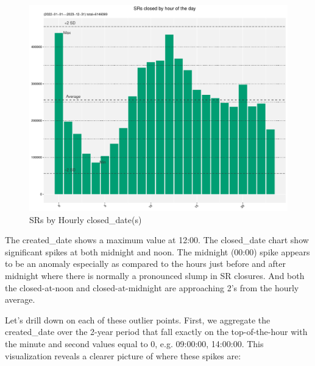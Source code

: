 \documentclass[12pt, titlepage]{article}
\begin{document}
	\begin{figure}[tbp]
		\centering
		\includegraphics[width = \textwidth]{Closed_Hourly_SR_count.pdf}
		\caption{SRs by Hourly closed\_date(s)}
		\label{fig:hourly-closed}
	\end{figure}	
	
	The created\_date shows a maximum value at 12:00. The closed\_date chart 
	show significant spikes at both midnight and noon. The midnight (00:00) 
	spike appears to be an anomaly especially as compared to the hours just 
	before and after midnight where there is normally a pronounced slump 
	in SR closures. And both the closed-at-noon and closed-at-midnight are 
	approaching 2\textsigma's from the hourly average. 

	Let's drill down on each of these outlier points. First, we aggregate the 
	created\_date over the 2-year period that fall exactly on the top-of-the-hour 
	with the minute and second values equal to 0, e.g. 09:00:00, 14:00:00. 
	This visualization reveals a clearer picture of where these spikes are:
	
\end{document}
